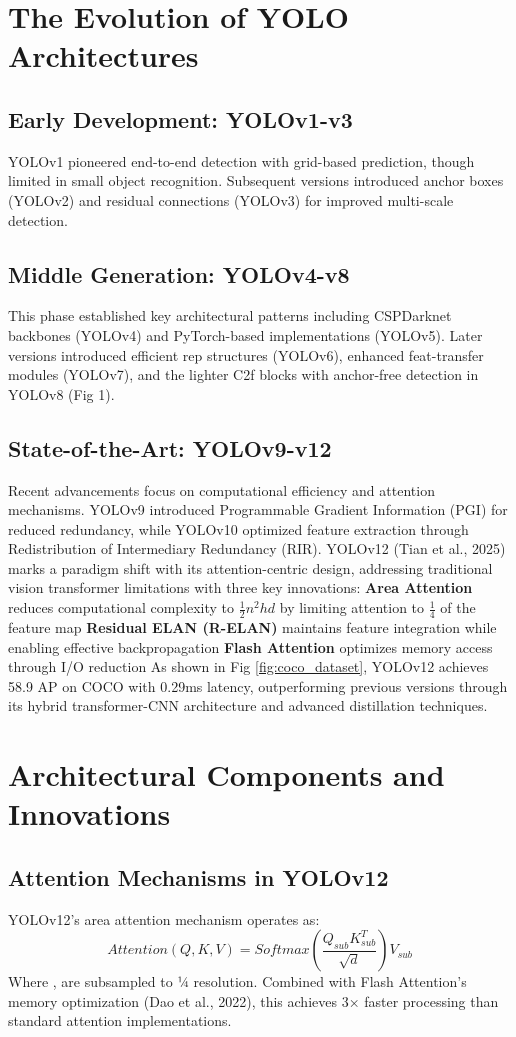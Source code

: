 \documentclass[11pt]{article}
\begin{document}
\section{The Evolution of YOLO Architectures}
\subsection{Early Development: YOLOv1-v3}
YOLOv1 pioneered end-to-end detection with grid-based prediction, though limited in small object recognition. Subsequent versions introduced anchor boxes (YOLOv2) and residual connections (YOLOv3) for improved multi-scale detection.
\subsection{Middle Generation: YOLOv4-v8}
This phase established key architectural patterns including CSPDarknet backbones (YOLOv4) and PyTorch-based implementations (YOLOv5). Later versions introduced efficient rep structures (YOLOv6), enhanced feat-transfer modules (YOLOv7), and the lighter C2f blocks with anchor-free detection in YOLOv8 (Fig 1).
\subsection{State-of-the-Art: YOLOv9-v12}
Recent advancements focus on computational efficiency and attention mechanisms. YOLOv9 introduced Programmable Gradient Information (PGI) for reduced redundancy, while YOLOv10 optimized feature extraction through Redistribution of Intermediary Redundancy (RIR). YOLOv12 (Tian et al., 2025) marks a paradigm shift with its attention-centric design, addressing traditional vision transformer limitations with three key innovations:
\textbf{Area Attention} reduces computational complexity to $\frac{1}{2}n^2hd$ by limiting attention to $\frac14$ of the feature map
\textbf{Residual ELAN (R-ELAN)} maintains feature integration while enabling effective backpropagation
\textbf{Flash Attention} optimizes memory access through I/O reduction
As shown in Fig \ref{fig:coco_dataset}, YOLOv12 achieves 58.9 AP on COCO with 0.29ms latency, outperforming previous versions through its hybrid transformer-CNN architecture and advanced distillation techniques.
\section{Architectural Components and Innovations}
\subsection{Attention Mechanisms in YOLOv12}
YOLOv12's area attention mechanism operates as:
\begin{equation}
Attention(Q,K,V) = Softmax(\frac{Q_{sub}K_{sub}^T}{\sqrt{d}})V_{sub}
\end{equation}
Where ,  are subsampled to ¼ resolution. Combined with Flash Attention's memory optimization (Dao et al., 2022), this achieves 3× faster processing than standard attention implementations.
\end{document}
